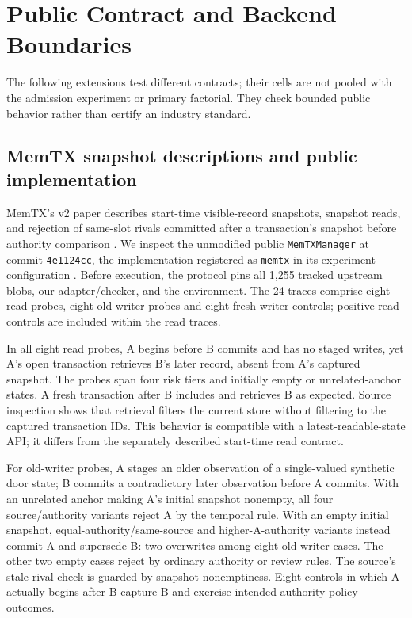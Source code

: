 \section{Public Contract and Backend Boundaries}
\label{sec:portability}
The following extensions test different contracts; their cells are not pooled with the admission experiment or primary factorial. They check bounded public behavior rather than certify an industry standard.

\subsection{MemTX snapshot descriptions and public implementation}
MemTX's v2 paper describes start-time visible-record snapshots, snapshot reads, and rejection of same-slot rivals committed after a transaction's snapshot before authority comparison \cite{li2026memtx}. We inspect the unmodified public \texttt{MemTXManager} at commit \texttt{4e1124cc}, the implementation registered as \texttt{memtx} in its experiment configuration \cite{memtx2026code}. Before execution, the protocol pins all 1,255 tracked upstream blobs, our adapter/checker, and the environment. The 24 traces comprise eight read probes, eight old-writer probes and eight fresh-writer controls; positive read controls are included within the read traces.

In all eight read probes, A begins before B commits and has no staged writes, yet A's open transaction retrieves B's later record, absent from A's captured snapshot. The probes span four risk tiers and initially empty or unrelated-anchor states. A fresh transaction after B includes and retrieves B as expected. Source inspection shows that retrieval filters the current store without filtering to the captured transaction IDs. This behavior is compatible with a latest-readable-state API; it differs from the separately described start-time read contract.

For old-writer probes, A stages an older observation of a single-valued synthetic door state; B commits a contradictory later observation before A commits. With an unrelated anchor making A's initial snapshot nonempty, all four source/authority variants reject A by the temporal rule. With an empty initial snapshot, equal-authority/same-source and higher-A-authority variants instead commit A and supersede B: two overwrites among eight old-writer cases. The other two empty cases reject by ordinary authority or review rules. The source's stale-rival check is guarded by snapshot nonemptiness. Eight controls in which A actually begins after B capture B and exercise intended authority-policy outcomes.

